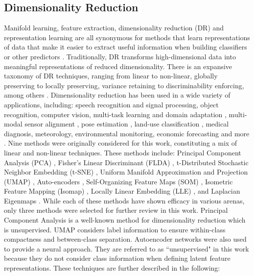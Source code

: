 \documentclass[conference]{IEEEtran}
\begin{document}
	\subsection{Dimensionality Reduction}
	Manifold learning, feature extraction, dimensionality reduction (DR) and representation learning are all synonymous for methods that learn representations of data that make it easier to extract useful information when building classifiers or other predictors \cite{Bengio2014RepLearningReview}. Traditionally, DR transforms high-dimensional data into meaningful representations of reduced dimensionality.  There is an expansive taxonomy of DR techniques, ranging from linear to non-linear, globally preserving to locally preserving, variance retaining to discriminability enforcing, among others \cite{VanDerMaaten2009DRReview}.  Dimensionality reduction has been used in a wide variety  of applications, including: speech recognition and signal processing, object recognition, computer vision, multi-task learning and domain adaptation \cite{Bengio2014RepLearningReview}, multi-modal sensor alignment \cite{zhang2010multisourceremotingsensingfusion,Davenport2010JointManifoldsDataFusion}, pose estimation \cite{Navaratnam2007JointManifoldSemiSupRegression}, land-use classification \cite{Hong2019LearnableManifoldAlignment}, medical diagnosis, meteorology, environmental monitoring, economic forecasting and more \cite{Zitova2003SurveyImageRegistrationMethods}.  Nine methods were originally considered for this work, constituting a mix of linear and non-linear techniques.  These methods include: Principal Component Analysis (PCA) \cite{Tipping1999PPCA,Murphy2012Textbook}, Fisher's Linear Discriminant (FLDA) \cite{Murphy2012Textbook,Sugiyama2006FDASupDimRed}, t-Distributed Stochastic Neighbor Embedding (t-SNE) \cite{vanDerMaaten2008tSNE}, Uniform Manifold Approximation and Projection (UMAP) \cite{McInnes2018UMAP}, Auto-encoders \cite{Haykin2009NeuralNetworks,Goodfellow2016DeepLearning}, Self-Organizing Feature Maps (SOM) \cite{Haykin2009NeuralNetworks,Kohonen1990SOM,Fritzke1995GrowingNeuralGas}, Isometric Feature  Mapping (Isomap) \cite{Tenenbaum2000Isomap,Thorstensen2009ManifoldThesis,VanDerMaaten2009DRReview}, Locally Linear Embedding (LLE) \cite{Roweis2000LLE,Saul2001LLEIntro}, and Laplacian Eigenmaps \cite{Belkin2003LaplacianEigenmaps,VanDerMaaten2009DRReview}.  While each of these methods have shown efficacy in various arenas, only three methods were selected for further review in this work. Principal Component Analysis is a well-known method for dimensionality reduction which is unsupervised. UMAP considers label information to ensure within-class compactness and between-class separation.  Autoencoder networks were also used to provide a neural approach.  They are referred to as ``unsupervised" in this work because they do not consider class information when defining latent feature representations. These techniques are further described in the following:
	
\end{document}
